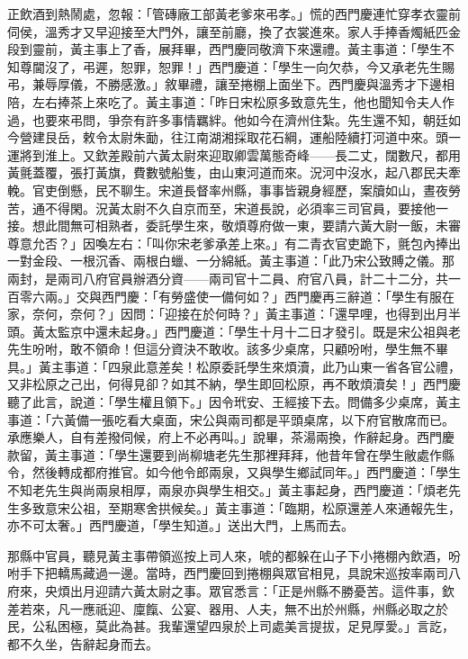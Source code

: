 正飲酒到熱鬧處，忽報：「管磚廠工部黃老爹來弔孝。」慌的西門慶連忙穿孝衣靈前伺侯，溫秀才又早迎接至大門外，讓至前廳，換了衣裳進來。家人手捧香燭紙匹金段到靈前，黃主事上了香，展拜畢，西門慶同敬濟下來還禮。黃主事道：「學生不知尊閫沒了，弔遲，恕罪，恕罪！」西門慶道：「學生一向欠恭，今又承老先生賜弔，兼辱厚儀，不勝感激。」敘畢禮，讓至捲棚上面坐下。西門慶與溫秀才下邊相陪，左右捧茶上來吃了。黃主事道：「昨日宋松原多致意先生，他也聞知令夫人作過，也要來弔問，爭奈有許多事情羈絆。他如今在濟州住紮。先生還不知，朝廷如今營建艮岳，敕令太尉朱勔，往江南湖湘採取花石綱，運船陸續打河道中來。頭一運將到淮上。又欽差殿前六黃太尉來迎取卿雲萬態奇峰——長二丈，闊數尺，都用黃氈蓋覆，張打黃旗，費數號船隻，由山東河道而來。況河中沒水，起八郡民夫牽輓。官吏倒懸，民不聊生。宋道長督率州縣，事事皆親身經歷，案牘如山，晝夜勞苦，通不得閑。況黃太尉不久自京而至，宋道長說，必須率三司官員，要接他一接。想此間無可相熟者，委託學生來，敬煩尊府做一東，要請六黃大尉一飯，未審尊意允否？」因喚左右：「叫你宋老爹承差上來。」有二青衣官吏跪下，氈包內捧出一對金段、一根沉香、兩根白蠟、一分綿紙。黃主事道：「此乃宋公致賻之儀。那兩封，是兩司八府官員辦酒分資——兩司官十二員、府官八員，計二十二分，共一百零六兩。」交與西門慶：「有勞盛使一備何如？」西門慶再三辭道：「學生有服在家，奈何，奈何？」因問：「迎接在於何時？」黃主事道：「還早哩，也得到出月半頭。黃太監京中還未起身。」西門慶道：「學生十月十二日才發引。既是宋公祖與老先生吩咐，敢不領命！但這分資決不敢收。該多少桌席，只顧吩咐，學生無不畢具。」黃主事道：「四泉此意差矣！松原委託學生來煩瀆，此乃山東一省各官公禮，又非松原之己出，何得見卻？如其不納，學生即回松原，再不敢煩瀆矣！」西門慶聽了此言，說道：「學生權且領下。」因令玳安、王經接下去。問備多少桌席，黃主事道：「六黃備一張吃看大桌面，宋公與兩司都是平頭桌席，以下府官散席而已。承應樂人，自有差撥伺候，府上不必再叫。」說畢，茶湯兩換，作辭起身。西門慶款留，黃主事道：「學生還要到尚柳塘老先生那裡拜拜，他昔年曾在學生敝處作縣令，然後轉成都府推官。如今他令郎兩泉，又與學生鄉試同年。」西門慶道：「學生不知老先生與尚兩泉相厚，兩泉亦與學生相交。」黃主事起身，西門慶道：「煩老先生多致意宋公祖，至期寒舍拱候矣。」黃主事道：「臨期，松原還差人來通報先生，亦不可太奢。」西門慶道，「學生知道。」送出大門，上馬而去。

那縣中官員，聽見黃主事帶領巡按上司人來，唬的都躲在山子下小捲棚內飲酒，吩咐手下把轎馬藏過一邊。當時，西門慶回到捲棚與眾官相見，具說宋巡按率兩司八府來，央煩出月迎請六黃太尉之事。眾官悉言：「正是州縣不勝憂苦。這件事，欽差若來，凡一應祇迎、廩餼、公宴、器用、人夫，無不出於州縣，州縣必取之於民，公私困極，莫此為甚。我輩還望四泉於上司處美言提拔，足見厚愛。」言訖，都不久坐，告辭起身而去。

